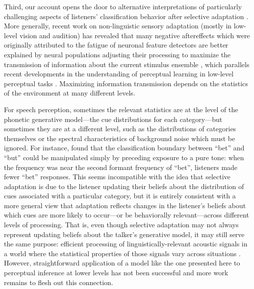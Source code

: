 \label{r4-sensory-adapt}
Third, our account opens the door to alternative interpretations of particularly challenging aspects of listeners' classification behavior after selective adaptation \autocite{KleinschmidtInPrep}. More generally, recent work on non-linguistic sensory adaptation (mostly in low-level vision and audition) has revealed that many negative aftereffects which were originally attributed to the fatigue of neuronal feature detectors are better explained by neural populations adjusting their processing to maximize the transmission of information about the current stimulus ensemble \autocite{Brenner2000,Fairhall2001,Gutfreund2012,Kohn2007,Sharpee2006,Webster2005}, which parallels recent developments in the understanding of perceptual learning in low-level perceptual tasks \autocite{Bejjanki2011a,Harris2012}.  Maximizing information transmission depends on the statistics of the environment at many different levels.

For speech perception, sometimes the relevant statistics are at the level of the phonetic generative model---the cue distributions for each category---but sometimes they are at a different level, such as the distributions of categories themselves or the spectral characteristics of background noise which must be ignored.  For instance, \textcite{Huang2012} found that the classification boundary between ``bet'' and ``but'' could be manipulated simply by preceding exposure to a pure tone: when the frequency was near the second formant frequency of ``bet'', listeners made fewer ``bet'' responses.  This seems incompatible with the idea that selective adaptation is due to the listener updating their beliefs about the distribution of cues associated with a particular category, but it is entirely consistent with a more general view that adaptation reflects changes in the listener's beliefs about which cues are more likely to occur---or be behaviorally relevant---across different levels of processing.  That is, even though selective adaptation may not always represent updating beliefs about the talker's generative model, it may still serve the same purpose: efficient processing of linguistically-relevant acoustic signals in a world where the statistical properties of those signals vary across situations \autocite{KleinschmidtInPrep}.  However, straightforward application of a model like the one presented here to perceptual inference at lower levels has not been successful \autocite{Stocker2006} and more work remains to flesh out this connection.

